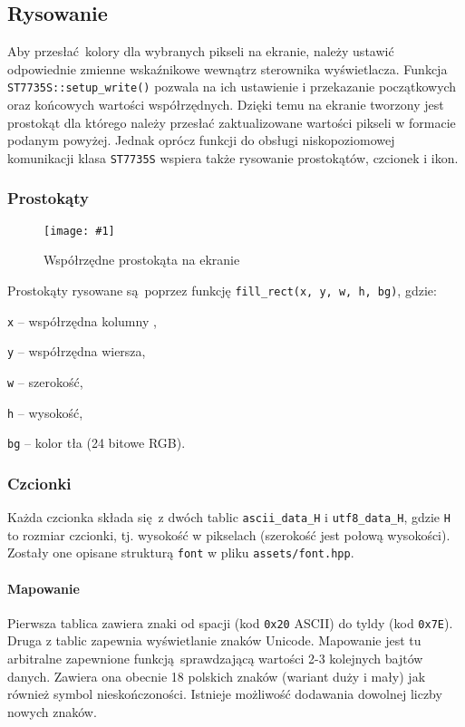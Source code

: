 \documentclass[12pt]{report}
\let\tempone\itemize
\let\temptwo\enditemize
\renewenvironment{itemize}{\tempone\setlength{\itemsep}{0cm}}{\temptwo}
\newcommand{\imgint}[4]{
	\begin{figure}[{#4}]
		\centering
		\texttt{[image: \#1]}
		\caption{#2}
		\label{#1}
	\end{figure}
}
\newcommand{\imgh}[3]{\imgint{#1}{#2}{#3}{H}}
\begin{document}
		\subsection{Rysowanie}
			Aby przesłać kolory dla wybranych pikseli na ekranie, należy ustawić odpowiednie zmienne wskaźnikowe wewnątrz sterownika wyświetlacza. Funkcja \lstinline|ST7735S::setup_write()| pozwala na ich ustawienie i przekazanie początkowych oraz końcowych wartości współrzędnych. Dzięki temu na ekranie tworzony jest prostokąt dla którego należy przesłać zaktualizowane wartości pikseli w formacie podanym powyżej. Jednak oprócz funkcji do obsługi niskopoziomowej komunikacji klasa \lstinline|ST7735S|  wspiera także rysowanie prostokątów, czcionek i ikon.
			
			\subsubsection{Prostokąty}
				\imgh{3/PicoRadio-screen-rect}{Współrzędne prostokąta na ekranie}{0.6}
				Prostokąty rysowane są poprzez funkcję \lstinline|fill_rect(x, y, w, h, bg)|, gdzie:
				\begin{itemize}
					\item \lstinline|x| -- współrzędna kolumny ,
					\item \lstinline|y| -- współrzędna wiersza,
					\item \lstinline|w| -- szerokość,
					\item \lstinline|h| -- wysokość,
					\item \lstinline|bg| -- kolor tła (24 bitowe RGB).
				\end{itemize}
			
			\subsubsection{Czcionki}
				Każda czcionka składa się z dwóch tablic \lstinline|ascii_data_H| i \lstinline|utf8_data_H|, gdzie \lstinline|H| to rozmiar czcionki, tj. wysokość w pikselach (szerokość jest połową wysokości). Zostały one opisane strukturą \lstinline|font| w pliku \lstinline|assets/font.hpp|.
				
				\paragraph{Mapowanie}
					Pierwsza tablica zawiera znaki od spacji (kod \lstinline|0x20| ASCII) do tyldy (kod \lstinline|0x7E|). Druga z tablic zapewnia wyświetlanie znaków Unicode. Mapowanie jest tu arbitralne zapewnione funkcją sprawdzającą wartości 2-3 kolejnych bajtów danych. Zawiera ona obecnie 18 polskich znaków (wariant duży i mały) jak również symbol nieskończoności. Istnieje możliwość dodawania dowolnej liczby nowych znaków.
				
\end{document}
